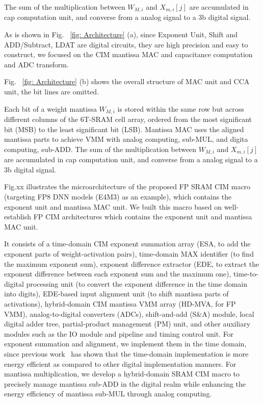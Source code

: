 The sum of the multiplication between  $W_{M,i}$ and $X_{m,i}[j]$ are accumulated in cap computation unit, and converse from a analog signal to a 3b digital signal.



As is shown in Fig. \textcolor{blue}{~\ref{fig: Architecture}} (a), since Exponent Unit, Shift and ADD/Subtract, LDAT are digital circuits, they are high precision and easy to construct, we focused on the CIM mantissa MAC and capacitance computation and ADC transform. 

Fig. \textcolor{blue}{~\ref{fig: Architecture}} (b) shows the overall structure of MAC unit and CCA unit, the bit lines are omitted. 

Each bit of a weight mantissa $W_{M,i}$ is stored within the same row but across different columns of the 6T-SRAM cell array, ordered from the most significant bit (MSB) to the least significant bit (LSB). Mantissa MAC uses the aligned mantissa parts to achieve VMM with analog computing, sub-MUL, and digita computing, sub-ADD. The sum of the multiplication between  $W_{M,i}$ and $X_{m,i}[j]$ are accumulated in cap computation unit, and converse from a analog signal to a 3b digital signal.
\fi




\iffalse


Fig.xx illustrates the microarchitecture of the proposed FP SRAM CIM macro (targeting FP8 DNN models (E4M3) as an example), which contains the exponent unit and mantissa MAC unit.
We built this macro based on well-establish FP CIM architectures
which contains the exponent unit and mantissa MAC unit.


It consists of a time-domain CIM exponent summation array (ESA, to add the exponent parts of weight-activation pairs), time-domain MAX identifier (to find the maximum exponent sum), exponent difference extractor (EDE, to extract the exponent difference between each exponent sum and the maximum one), time-to-digital processing unit (to convert the exponent difference in the time domain into digits), EDE-based input alignment unit (to shift mantissa parts of activations), hybrid-domain CIM mantissa VMM array (HD-MVA, for FP VMM), analog-to-digital converters (ADCs), shift-and-add (S\&A) module, local digital adder tree, partial-product management (PM) unit, and other auxiliary modules such as the IO module and pipeline and timing control unit.
For exponent summation and alignment, we implement them in the time domain, since previous work~\cite{time_domain,SRAM_CIM_FP_1} has shown that the time-domain implementation is more energy efficient as compared to other digital implementation manners.
For mantissa multiplication, we develop a hybrid-domain SRAM CIM macro to precisely manage mantissa sub-ADD in the digital realm while enhancing the energy efficiency of mantissa sub-MUL through analog computing.


